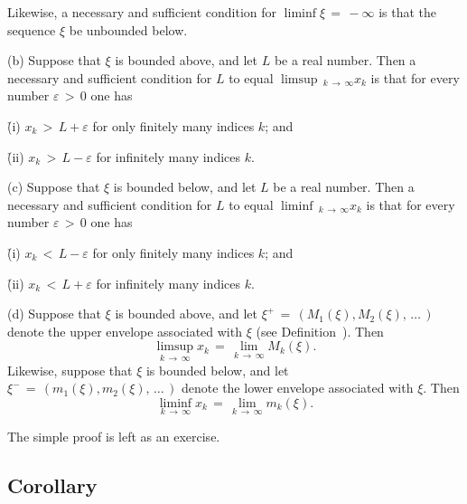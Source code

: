 {    Likewise, a necessary and sufficient condition for $\liminf {\xi} \,=\, -{\infty}$ is that the sequence ${\xi}$ be unbounded below.


\V

        (b) Suppose that ${\xi}$ is bounded above, and let $L$ be a real number.
    Then a necessary and sufficient condition for $L$ to equal $\limsup\,_{k \,{\rightarrow}\, {\infty}} x_{k}$ is that for every number ${\varepsilon}\,>\,0$ one has

        \h (i) $x_{k}\,>\,L+{\varepsilon}$ for only finitely many indices $k$; and

        \h (ii) $x_{k}\,>\,L-{\varepsilon}$ for infinitely many indices $k$.

        \V

        (c) Suppose that ${\xi}$ is bounded below, and let $L$ be a real number.
    Then a necessary and sufficient condition for $L$ to equal $\liminf\,_{k \,{\rightarrow}\, {\infty}} x_{k}$ is that for every number ${\varepsilon}\,>\,0$ one has

        \h (i) $x_{k}\,<\,L-{\varepsilon}$ for only finitely many indices $k$; and

        \h (ii) $x_{k}\,<\,L+{\varepsilon}$ for infinitely many indices $k$.

\V

\V

        (d) Suppose that ${\xi}$ is bounded above, and let ${\xi}^{+} \,=\, (M_{1}({\xi}),M_{2}({\xi}),\,{\ldots}\,)$ denote the upper envelope associated with ${\xi}$ (see Definition~). Then
        \begin{equation}
        \label{EqnC.55a}
        \limsup_{k \,{\rightarrow}\, {\infty}} x_{k} \,=\, \lim_{k \,{\rightarrow}\, {\infty}} M_{k}({\xi}). 
        \end{equation}
    Likewise, suppose that ${\xi}$ is bounded below, and let ${\xi}^{-} \,=\, (m_{1}({\xi}),m_{2}({\xi}),\,{\ldots}\,)$ denote the lower envelope associated with ${\xi}$. Then
        \begin{equation}
        \label{EqnC.55b}
        \liminf_{k \,{\rightarrow}\, {\infty}} x_{k} \,=\, \lim_{k \,{\rightarrow}\, {\infty}} m_{k}({\xi}). 
        \end{equation}


        The simple proof is left as an exercise.

\V

            \subsection{\small{\bf Corollary}}
            \label{CorC50.180}

}
